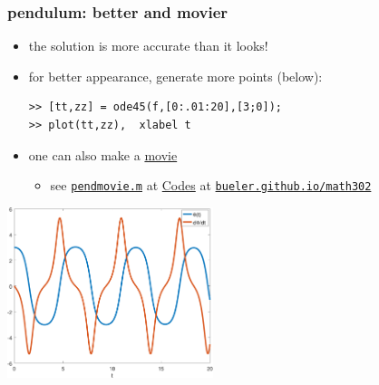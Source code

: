 \documentclass[dvipsnames,colorlinks]{beamer}
\begin{document}
\begin{frame}[fragile]
\frametitle{pendulum: better and movier}

\small
\begin{itemize}
\item the solution is more accurate than it looks!
\item for better appearance, generate more points (below):
\begin{Verbatim}[fontsize=\small]
>> [tt,zz] = ode45(f,[0:.01:20],[3;0]);
>> plot(tt,zz),  xlabel t
\end{Verbatim}
\item one can also make a \href{https://bueler.github.io/math302/assets/codes/pendmovie.gif}{movie}
    \begin{itemize}
    \item see \href{https://bueler.github.io/math302/assets/codes/pendmovie.m}{\texttt{pendmovie.m}} at \href{https://bueler.github.io/math302/codes.html}{Codes} at \href{https://bueler.github.io/math302/}{\texttt{bueler.github.io/math302}}
    \end{itemize}
\end{itemize}

\includegraphics[width=0.45\textwidth]{figs/pend-smooth}
\end{frame}
\end{document}
